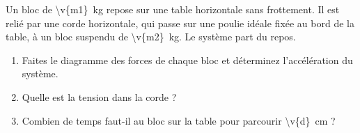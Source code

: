 Un bloc de \qty{\v{m1}}{kg} repose sur une table horizontale sans frottement. Il est relié par une corde horizontale, qui passe sur une poulie idéale fixée au bord de la table, à un bloc suspendu de \qty{\v{m2}}{kg}. Le système part du repos.

\begin{enumerate}[label=\alph*)]
    \item Faites le diagramme des forces de chaque bloc et déterminez l'accélération du système.
    \item Quelle est la tension dans la corde ?
    \item Combien de temps faut-il au bloc sur la table pour parcourir \qty{\v{d}}{cm} ?
\end{enumerate}
